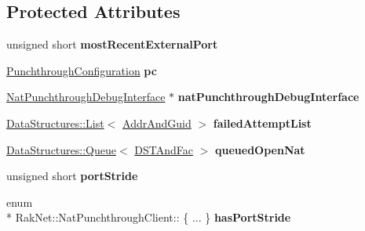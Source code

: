 \subsection*{Protected Attributes}
\begin{DoxyCompactItemize}
\item 
\hypertarget{class_rak_net_1_1_nat_punchthrough_client_af0bf1732b3c216e26dddd35ac9b0d09b}{unsigned short {\bfseries most\-Recent\-External\-Port}}\label{class_rak_net_1_1_nat_punchthrough_client_af0bf1732b3c216e26dddd35ac9b0d09b}

\item 
\hypertarget{class_rak_net_1_1_nat_punchthrough_client_ade9a2b8f40cdd447c13ce5a0e69e1da8}{\hyperlink{struct_rak_net_1_1_punchthrough_configuration}{Punchthrough\-Configuration} {\bfseries pc}}\label{class_rak_net_1_1_nat_punchthrough_client_ade9a2b8f40cdd447c13ce5a0e69e1da8}

\item 
\hypertarget{class_rak_net_1_1_nat_punchthrough_client_aad4712a0686de7a9882d5214ff1b3b98}{\hyperlink{struct_rak_net_1_1_nat_punchthrough_debug_interface}{Nat\-Punchthrough\-Debug\-Interface} $\ast$ {\bfseries nat\-Punchthrough\-Debug\-Interface}}\label{class_rak_net_1_1_nat_punchthrough_client_aad4712a0686de7a9882d5214ff1b3b98}

\item 
\hypertarget{class_rak_net_1_1_nat_punchthrough_client_a76f363b04f7b2fe72f9c447810ad9b40}{\hyperlink{class_data_structures_1_1_list}{Data\-Structures\-::\-List}$<$ \hyperlink{struct_rak_net_1_1_nat_punchthrough_client_1_1_addr_and_guid}{Addr\-And\-Guid} $>$ {\bfseries failed\-Attempt\-List}}\label{class_rak_net_1_1_nat_punchthrough_client_a76f363b04f7b2fe72f9c447810ad9b40}

\item 
\hypertarget{class_rak_net_1_1_nat_punchthrough_client_a09ec532d4e5825b33ad878215ecbf371}{\hyperlink{class_data_structures_1_1_queue}{Data\-Structures\-::\-Queue}$<$ \hyperlink{struct_rak_net_1_1_nat_punchthrough_client_1_1_d_s_t_and_fac}{D\-S\-T\-And\-Fac} $>$ {\bfseries queued\-Open\-Nat}}\label{class_rak_net_1_1_nat_punchthrough_client_a09ec532d4e5825b33ad878215ecbf371}

\item 
\hypertarget{class_rak_net_1_1_nat_punchthrough_client_a4554464dfd6f31b423fd917ac0c7ceca}{unsigned short {\bfseries port\-Stride}}\label{class_rak_net_1_1_nat_punchthrough_client_a4554464dfd6f31b423fd917ac0c7ceca}

\item 
\hypertarget{class_rak_net_1_1_nat_punchthrough_client_a3013ea7e11ff767a3c94fa17a1a610ed}{enum \\*
Rak\-Net\-::\-Nat\-Punchthrough\-Client\-:: \{ ... \}  {\bfseries has\-Port\-Stride}}\label{class_rak_net_1_1_nat_punchthrough_client_a3013ea7e11ff767a3c94fa17a1a610ed}


\end{DoxyCompactItemize}
